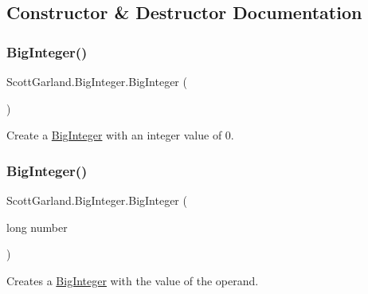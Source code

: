 \subsection{Constructor \& Destructor Documentation}
\mbox{\label{class_scott_garland_1_1_big_integer_a8255378a9b7d296d78d3bc446f7b3949}} 
\subsubsection{\texorpdfstring{Big\+Integer()}{BigInteger()}\hspace{0.1cm}{\footnotesize\ttfamily [1/8]}}
{\footnotesize\ttfamily Scott\+Garland.\+Big\+Integer.\+Big\+Integer (\begin{DoxyParamCaption}{ }\end{DoxyParamCaption})\hspace{0.3cm}{\ttfamily [inline]}}



Create a \hyperlink{class_scott_garland_1_1_big_integer}{Big\+Integer} with an integer value of 0. 

\mbox{\label{class_scott_garland_1_1_big_integer_a814a50a2d47afab9a43e74204a53fcf0}} 
\subsubsection{\texorpdfstring{Big\+Integer()}{BigInteger()}\hspace{0.1cm}{\footnotesize\ttfamily [2/8]}}
{\footnotesize\ttfamily Scott\+Garland.\+Big\+Integer.\+Big\+Integer (\begin{DoxyParamCaption}\item[{long}]{number }\end{DoxyParamCaption})\hspace{0.3cm}{\ttfamily [inline]}}



Creates a \hyperlink{class_scott_garland_1_1_big_integer}{Big\+Integer} with the value of the operand. 


